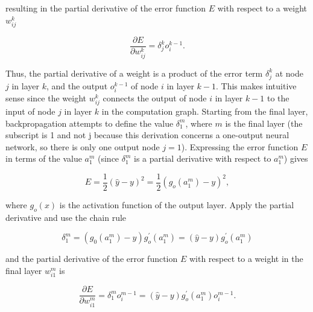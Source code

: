 \documentclass[main.tex]{subfiles}
\begin{document}
\begin{enumerate}
\begin{enumerate}
        resulting in the partial derivative of the error function $E$ with respect to a weight $w_{ij}^k$ 
        
        \begin{equation} \label{partialErrorPartialWeightRedefined}
        \frac{\partial E}{\partial w_{i j}^{k}}=\delta_{j}^{k} o_{i}^{k-1}.
        \end{equation}
        
        Thus, the partial derivative of a weight is a product of the error term $\delta_j^k$ at node $j$ in layer $k$, and the output $o_i^{k-1}$ of node $i$ in layer $k-1$. This makes intuitive sense since the weight $w_{ij}^{k}$ connects the output of node $i$ in layer $k-1$ to the input of node $j$ in layer $k$ in the computation graph. Starting from the final layer, backpropagation attempts to define the value $\delta_{1}^{m}$, where $m$ is the final layer (the subscript is 1 and not j because this derivation concerns a one-output neural network, so there is only one output node $j=1$). Expressing the error function $E$ in terms of the value $a_1^m$ (since $\delta_1^m$ is a partial derivative with respect to $a_1^m$) gives 
        
        \begin{equation} \label{errorFunctionInTermsOfActivation}
        E=\frac{1}{2}(\hat{y}-y)^{2}=\frac{1}{2}\left(g_{o}\left(a_{1}^{m}\right)-y\right)^{2},
        \end{equation}
        
        where $g_{o}(x)$ is the activation function of the output layer. Apply the partial derivative and use the chain rule 
        
        \begin{equation} \label{errorNodeOneFinalLayer}
        \delta_{1}^{m}=\left(g_{0}\left(a_{1}^{m}\right)-y\right) g_{o}^{\prime}\left(a_{1}^{m}\right)=(\hat{y}-y) g_{o}^{\prime}\left(a_{1}^{m}\right)
        \end{equation}
        
        and the partial derivative of the error function $E$ with respect to a weight in the final layer $w_{i1}^m$ is 
        
        \begin{equation} \label{partialErrorPartialWeightFinalLayer}
        \frac{\partial E}{\partial w_{i 1}^{m}}=\delta_{1}^{m} o_{i}^{m-1}=(\hat{y}-y) g_{o}^{\prime}\left(a_{1}^{m}\right) o_{i}^{m-1}.
        \end{equation}
    

\end{enumerate}
\end{enumerate}
\end{document}
